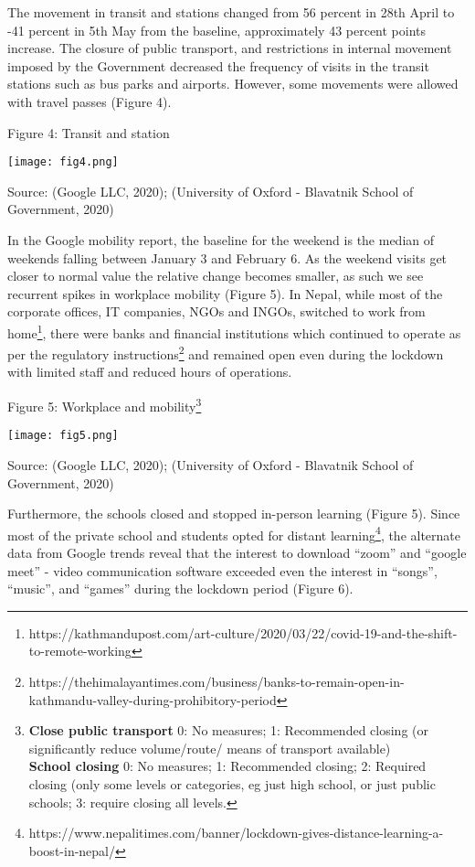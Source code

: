 \documentclass{article}
\begin{document}
\pagebreak

The movement in transit and stations changed from 56 percent in 28th April to -41 percent in 5th May from the baseline, approximately 43 percent points increase. The closure of public transport, and restrictions in internal movement imposed by the Government decreased the frequency of visits in the transit stations such as bus parks and airports. However, some movements were allowed with travel passes (Figure 4). 

\textcolor{black!65}{Figure 4: Transit and station}

\texttt{[image: fig4.png]}

\textcolor{black!65}{Source: (Google LLC, 2020); (University of Oxford - Blavatnik School of Government, 2020)}

\pagebreak

In the Google mobility report, the baseline for the weekend is the median of weekends falling between January 3 and February 6. As the weekend visits get closer to normal value the relative change becomes smaller, as such we see recurrent spikes in workplace mobility (Figure 5).  In Nepal, while most of the corporate offices, IT companies, NGOs and INGOs,  switched to work from home\footnote{https://kathmandupost.com/art-culture/2020/03/22/covid-19-and-the-shift-to-remote-working}, there were banks and financial institutions which continued to operate as per the regulatory instructions\footnote{https://thehimalayantimes.com/business/banks-to-remain-open-in-kathmandu-valley-during-prohibitory-period} and remained open even during the lockdown with limited staff and reduced hours of operations. 

\textcolor{black!65}{Figure 5: Workplace and mobility\footnote{\textbf{Close public transport} 0: No measures; 1: Recommended closing (or significantly reduce volume/route/ means of transport available)\\
\textbf{School closing} 0: No measures; 1: Recommended closing; 2: Required closing (only some levels or categories, eg just high school, or just public schools; 3: require closing all levels.}}

\texttt{[image: fig5.png]}

\textcolor{black!65}{Source: (Google LLC, 2020); (University of Oxford - Blavatnik School of Government, 2020)}

\pagebreak

Furthermore, the schools closed and stopped in-person learning (Figure 5). Since most of the private school and students opted for distant learning\footnote{https://www.nepalitimes.com/banner/lockdown-gives-distance-learning-a-boost-in-nepal/}, the alternate data from Google trends reveal that the interest to download “zoom” and “google meet” - video communication software exceeded even the interest in “songs”, “music”, and “games”  during the lockdown period (Figure 6).
\end{document}
